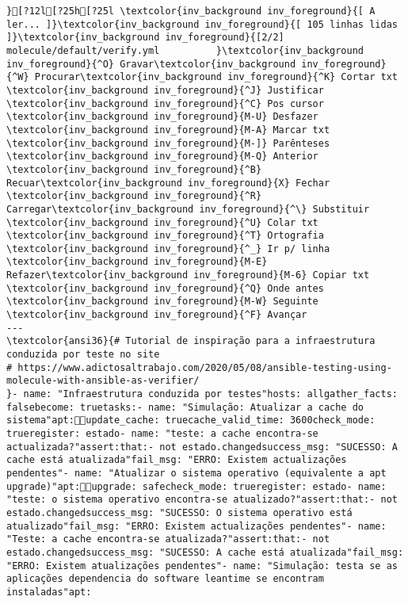 \documentclass{scrartcl}
\begin{document}
\begin{Verbatim}
}[?12l[?25h[?25l \textcolor{inv_background inv_foreground}{[ A ler... ]}\textcolor{inv_background inv_foreground}{[ 105 linhas lidas ]}\textcolor{inv_background inv_foreground}{[2/2]       molecule/default/verify.yml          }\textcolor{inv_background inv_foreground}{^O} Gravar\textcolor{inv_background inv_foreground}{^W} Procurar\textcolor{inv_background inv_foreground}{^K} Cortar txt    \textcolor{inv_background inv_foreground}{^J} Justificar    \textcolor{inv_background inv_foreground}{^C} Pos cursor    \textcolor{inv_background inv_foreground}{M-U} Desfazer     \textcolor{inv_background inv_foreground}{M-A} Marcar txt   \textcolor{inv_background inv_foreground}{M-]} Parênteses   \textcolor{inv_background inv_foreground}{M-Q} Anterior     \textcolor{inv_background inv_foreground}{^B} Recuar\textcolor{inv_background inv_foreground}{X} Fechar  \textcolor{inv_background inv_foreground}{^R} Carregar\textcolor{inv_background inv_foreground}{^\} Substituir    \textcolor{inv_background inv_foreground}{^U} Colar txt     \textcolor{inv_background inv_foreground}{^T} Ortografia    \textcolor{inv_background inv_foreground}{^_} Ir p/ linha   \textcolor{inv_background inv_foreground}{M-E} Refazer\textcolor{inv_background inv_foreground}{M-6} Copiar txt   \textcolor{inv_background inv_foreground}{^Q} Onde antes    \textcolor{inv_background inv_foreground}{M-W} Seguinte     \textcolor{inv_background inv_foreground}{^F} Avançar
---
\textcolor{ansi36}{# Tutorial de inspiração para a infraestrutura conduzida por teste no site
# https://www.adictosaltrabajo.com/2020/05/08/ansible-testing-using-molecule-with-ansible-as-verifier/
}- name: "Infraestrutura conduzida por testes"hosts: allgather_facts: falsebecome: truetasks:- name: "Simulação: Atualizar a cache do sistema"apt:update_cache: truecache_valid_time: 3600check_mode: trueregister: estado- name: "teste: a cache encontra-se actualizada?"assert:that:- not estado.changedsuccess_msg: "SUCESSO: A cache está atualizada"fail_msg: "ERRO: Existem actualizações pendentes"- name: "Atualizar o sistema operativo (equivalente a apt upgrade)"apt:upgrade: safecheck_mode: trueregister: estado- name: "teste: o sistema operativo encontra-se atualizado?"assert:that:- not estado.changedsuccess_msg: "SUCESSO: O sistema operativo está atualizado"fail_msg: "ERRO: Existem actualizações pendentes"- name: "Teste: a cache encontra-se atualizada?"assert:that:- not estado.changedsuccess_msg: "SUCESSO: A cache está atualizada"fail_msg: "ERRO: Existem atualizações pendentes"- name: "Simulação: testa se as aplicações dependencia do software leantime se encontram instaladas"apt:

\end{Verbatim}
\end{document}
